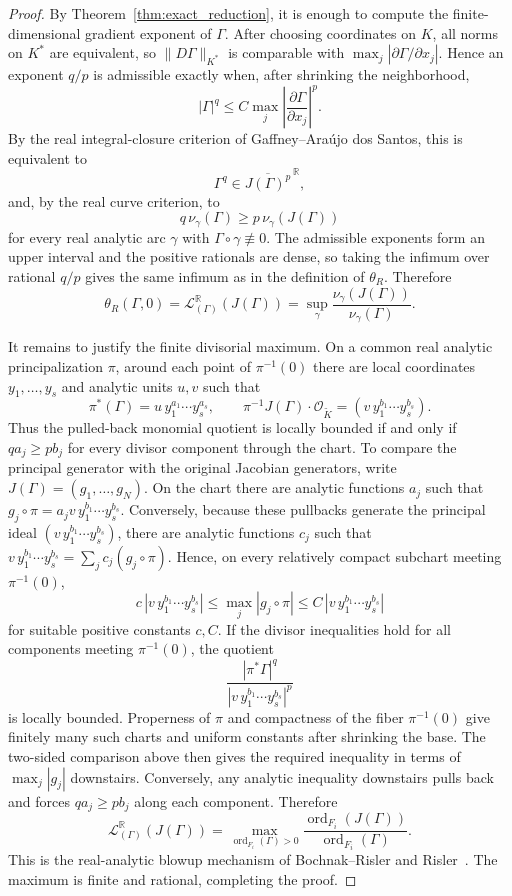 \documentclass[11pt]{article}
\theoremstyle{definition}
\theoremstyle{remark}
\begin{document}
\begin{proof}
By Theorem~\ref{thm:exact_reduction}, it is enough to compute the finite-dimensional gradient exponent of $\Gamma$. After choosing coordinates on $K$, all norms on $K^*$ are equivalent, so $\|D\Gamma\|_{K^*}$ is comparable with $\max_j|\partial\Gamma/\partial x_j|$. Hence an exponent $q/p$ is admissible exactly when, after shrinking the neighborhood,
$$
|\Gamma|^q\le C\max_j\left|\frac{\partial\Gamma}{\partial x_j}\right|^p.
$$
By the real integral-closure criterion of Gaffney--Ara\'ujo dos Santos, this is equivalent to
$$
\Gamma^q\in\overline{J(\Gamma)^p}^{\,\mathbb R},
$$
and, by the real curve criterion, to
$$
q\,\nu_\gamma(\Gamma)\ge p\,\nu_\gamma(J(\Gamma))
$$
for every real analytic arc $\gamma$ with $\Gamma\circ\gamma\not\equiv0$. The admissible exponents form an upper interval and the positive rationals are dense, so taking the infimum over rational $q/p$ gives the same infimum as in the definition of $\theta_R$. Therefore
$$
\theta_R(\Gamma,0)
=\mathcal L^{\mathbb R}_{(\Gamma)}(J(\Gamma))
=\sup_\gamma\frac{\nu_\gamma(J(\Gamma))}{\nu_\gamma(\Gamma)}.
$$

It remains to justify the finite divisorial maximum. On a common real analytic principalization $\pi$, around each point of $\pi^{-1}(0)$ there are local coordinates $y_1,\ldots,y_s$ and analytic units $u,v$ such that
$$
\pi^*(\Gamma)=u\,y_1^{a_1}\cdots y_s^{a_s},
\qquad
\pi^{-1}J(\Gamma)\cdot\mathcal O_{\widetilde K}
=(v\,y_1^{b_1}\cdots y_s^{b_s}).
$$
Thus the pulled-back monomial quotient is locally bounded if and only if $qa_j\ge pb_j$ for every divisor component through the chart. To compare the principal generator with the original Jacobian generators, write $J(\Gamma)=(g_1,\ldots,g_N)$. On the chart there are analytic functions $a_j$ such that $g_j\circ\pi=a_jv\,y_1^{b_1}\cdots y_s^{b_s}$. Conversely, because these pullbacks generate the principal ideal $(v\,y_1^{b_1}\cdots y_s^{b_s})$, there are analytic functions $c_j$ such that
$v\,y_1^{b_1}\cdots y_s^{b_s}=\sum_j c_j(g_j\circ\pi)$. Hence, on every relatively compact subchart meeting $\pi^{-1}(0)$,
$$
c\,|v\,y_1^{b_1}\cdots y_s^{b_s}|
\le \max_j|g_j\circ\pi|
\le C\,|v\,y_1^{b_1}\cdots y_s^{b_s}|
$$
for suitable positive constants $c,C$. If the divisor inequalities hold for all components meeting $\pi^{-1}(0)$, the quotient
$$
\frac{|\pi^*\Gamma|^q}{|v\,y_1^{b_1}\cdots y_s^{b_s}|^p}
$$
is locally bounded. Properness of $\pi$ and compactness of the fiber $\pi^{-1}(0)$ give finitely many such charts and uniform constants after shrinking the base. The two-sided comparison above then gives the required inequality in terms of $\max_j|g_j|$ downstairs. Conversely, any analytic inequality downstairs pulls back and forces $qa_j\ge pb_j$ along each component. Therefore
$$
\mathcal L^{\mathbb R}_{(\Gamma)}(J(\Gamma))
=\max_{\operatorname{ord}_{F_i}(\Gamma)>0}
\frac{\operatorname{ord}_{F_i}(J(\Gamma))}{\operatorname{ord}_{F_i}(\Gamma)}.
$$
This is the real-analytic blowup mechanism of Bochnak--Risler and Risler~\cite{BochnakRisler1975,LejeuneTeissier2008}. The maximum is finite and rational, completing the proof.
\end{proof}
\end{document}
